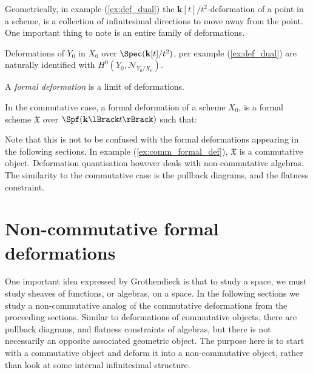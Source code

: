     
    

    Geometrically, in example  (\ref{ex:def_dual}) the \( \mathbf{k}[t]/t^2\)-deformation of a point in a scheme, is a collection of infinitesimal directions to move away from the point. One important thing to note is an entire family of deformations. 

    
    

    \begin{thm} 
    Deformations of \(Y_0\) in \(X_0\) over \( \Spec(\mathbf{k}[t]/t^2)\), per example (\ref{ex:def_dual}) are naturally identified with  \( H^0(Y_0, \mathcal{N}_{Y_0/X_0})\).
    \end{thm}
    
    A \emph{formal deformation} is a limit of deformations. 
    \begin{ex} 
    \label{ex:comm_formal_def}
    In the commutative case, a formal deformation of a scheme \(X_0\), is a formal scheme \( \mathfrak{X}\) over \(\Spf(\mathbf{k} \lBrack t \rBrack )\) such that:
    \begin{center}
    \end{center}
    \end{ex}
    Note that this is not to be confused with the formal deformations appearing in the following sections. In example (\ref{ex:comm_formal_def}), \( \mathfrak{X}\) is a commutative object. Deformation quantisation however deals with non-commutative algebras. The similarity to the commutative case is the pullback diagrams, and the flatness constraint.
    
    \section{Non-commutative formal deformations}

    One important idea expressed by Grothendieck is that to study a space, we must study sheaves of functions, or algebras, on a space. In the following sections we study a non-commutative analog of the commutative deformations from the proceeding sections. Similar to deformations of commutative objects, there are pullback diagrams, and flatness constraints of algebras, but there is not necessarily an opposite associated geometric object. The purpose here is to start with a commutative object and deform it into a non-commutative object, rather than look at some internal infinitesimal structure.
    
